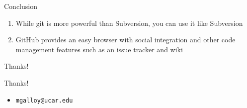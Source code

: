 \documentclass{beamer}
\begin{document}
\begin{frame}{Conclusion}
  \begin{enumerate}
    \item While git is more powerful than Subversion, you can use it like Subversion
    \item GitHub provides an easy browser with social integration and other code management features such as an issue tracker and wiki
  \end{enumerate}
\end{frame}

\begin{frame}{Thanks!}
  \begin{center}{\huge Thanks!}\end{center}
  \begin{itemize}
    \item {\tt mgalloy@ucar.edu}
  \end{itemize}
\end{frame}
\end{document}
